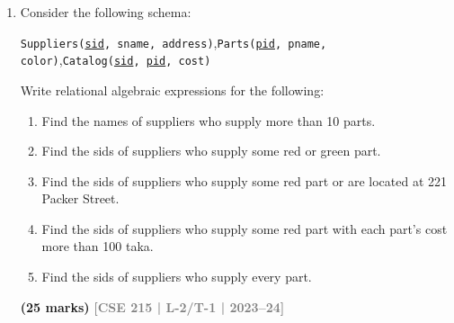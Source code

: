 \documentclass[12pt,a3paper]{article}
\newcommand{\yr}[1]{\hfill\textcolor{gray}{\small\textbf{[#1]}}}
\newcommand{\mk}[1]{\textcolor{orange!70!black}{\small\textbf{(#1 marks)}}}
\begin{document}
\begin{enumerate}
\item Consider the following schema:
\begin{center}
\texttt{Suppliers(\underline{sid}, sname, address)},\quad \texttt{Parts(\underline{pid}, pname, color)},\quad \texttt{Catalog(\underline{sid}, \underline{pid}, cost)}
\end{center}
Write relational algebraic expressions for the following:
\begin{enumerate}
  \item Find the names of suppliers who supply more than 10 parts.
  \item Find the sids of suppliers who supply some red or green part.
  \item Find the sids of suppliers who supply some red part or are located at 221 Packer Street.
  \item Find the sids of suppliers who supply some red part with each part's cost more than 100 taka.
  \item Find the sids of suppliers who supply every part.
\end{enumerate}
\mk{25} \yr{CSE 215 | L-2/T-1 | 2023--24}


\end{enumerate}
\end{document}
